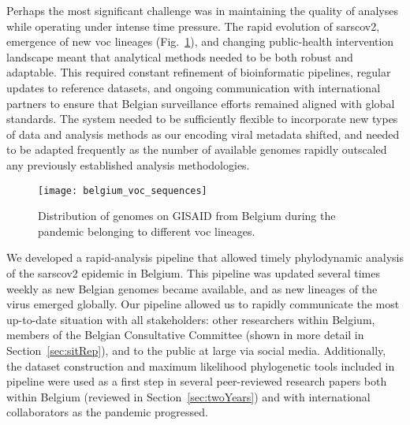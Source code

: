 Perhaps the most significant challenge was in maintaining the quality of analyses while operating under intense time pressure.
The rapid evolution of \gls{sarscov2}, emergence of new \gls{voc} lineages (Fig.~\ref{fig:beVoc}), and changing public-health intervention landscape meant that analytical methods needed to be both robust and adaptable.
This required constant refinement of bioinformatic pipelines, regular updates to reference datasets, and ongoing communication with international partners to ensure that Belgian surveillance efforts remained aligned with global standards.
The system needed to be sufficiently flexible to incorporate new types of data and analysis methods as our encoding viral metadata shifted, and needed to be adapted frequently as the number of available genomes rapidly outscaled any previously established analysis methodologies.

\begin{figure}[ht]
  \centering
  \texttt{[image: belgium\_voc\_sequences]}
  \caption[VOC sequences in Belgium]{Distribution of genomes on GISAID from Belgium during the pandemic belonging to different \gls{voc} lineages.}
  \label{fig:beVoc}
\end{figure}

We developed a rapid-analysis pipeline that allowed timely phylodynamic analysis of the \gls{sarscov2} epidemic in Belgium.
This pipeline was updated several times weekly as new Belgian genomes became available, and as new lineages of the virus emerged globally.
Our pipeline allowed us to rapidly communicate the most up-to-date situation with all stakeholders: other researchers within Belgium, members of the Belgian Consultative Committee (shown in more detail in Section~\ref{sec:sitRep}), and to the public at large via social media.
Additionally, the dataset construction and maximum likelihood phylogenetic tools included in pipeline were used as a first step in several peer-reviewed research papers both within Belgium (reviewed in Section~\ref{sec:twoYears}) and with international collaborators \citep{dudas2021emergence,holtz2024emergence} as the pandemic progressed.

